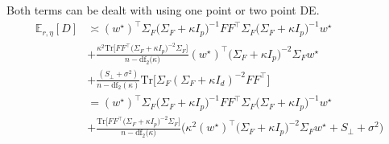 Both terms can be dealt with using one point or two point DE.
\begin{align}
\mathbb{E}_{r,\eta}[D] & \asymp(w^{\star})^{\top}\Sigma_{F}\bigl(\Sigma_{F}+\kappa I_{p}\bigr)^{-1}FF^{\top}\Sigma_{F}\bigl(\Sigma_{F}+\kappa I_{p}\bigr)^{-1}w^{\star}\nonumber \\
 & +\frac{\kappa^{2}\mbox{Tr}\bigl[FF^{\top}\bigl(\Sigma_{F}+\kappa I_{p}\bigr)^{-2}\Sigma_{F}\bigr]}{n-\mathrm{df}_{2}\bigl(\kappa\bigr)}(w^{\star})^{\top}\bigl(\Sigma_{F}+\kappa I_{p}\bigr)^{-2}\Sigma_{F}w^{\star}\nonumber \\
 & +\frac{(S_{\perp}+\sigma^{2})}{n-\mathrm{df}_{2}(\kappa)}\mathrm{Tr}\Big[\Sigma_{F}(\Sigma_{F}+\kappa I_{d})^{-2}FF^{\top}\Big]\nonumber \\
 & =(w^{\star})^{\top}\Sigma_{F}\bigl(\Sigma_{F}+\kappa I_{p}\bigr)^{-1}FF^{\top}\Sigma_{F}\bigl(\Sigma_{F}+\kappa I_{p}\bigr)^{-1}w^{\star}\nonumber \\
 & +\frac{\mbox{Tr}\bigl[FF^{\top}\bigl(\Sigma_{F}+\kappa I_{p}\bigr)^{-2}\Sigma_{F}\bigr]}{n-\mathrm{df}_{2}\bigl(\kappa\bigr)}\Big(\kappa^{2}(w^{\star})^{\top}\bigl(\Sigma_{F}+\kappa I_{p}\bigr)^{-2}\Sigma_{F}w^{\star}+S_{\perp}+\sigma^{2}\Big)\label{eq:feat_space_acc_D_expectation_DE}
\end{align}

